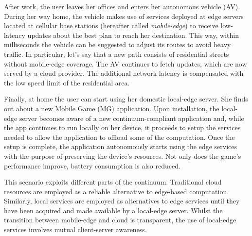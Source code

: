 After work, the user leaves her offices and enters her autonomous vehicle (AV). During her way home, the vehicle makes use of services deployed at edge servers located at cellular base stations (hereafter called \textit{mobile-edge}) to receive low-latency updates about the best plan to reach her destination. This way, within milliseconds the vehicle can be suggested to adjust its routes to avoid heavy traffic. In particular, let's say that a new path consists of residential streets without mobile-edge coverage. The AV continues to fetch updates, which are now served by a cloud provider. The additional network latency is compensated with the low speed limit of the residential area.

Finally, at home the user can start using her domestic local-edge server. She finds out about a new Mobile Game (MG) application. Upon installation, the local-edge server becomes aware of a new continuum-compliant application and, while the app continues to run locally on her device, it proceeds to setup the services needed to allow the application to offload some of the computation. Once the setup is complete, the application autonomously starts using the edge services with the purpose of preserving the device's resources. Not only does the game's performance improve, battery consumption is also reduced.  

This scenario exploits different parts of the continuum. Traditional cloud resources are employed as a reliable alternative to edge-based computation. Similarly, local services are employed as alternatives to edge services until they have been acquired and made available by a local-edge server. Whilst the transition between mobile-edge and cloud is transparent, the use of local-edge services involves mutual client-server awareness.

